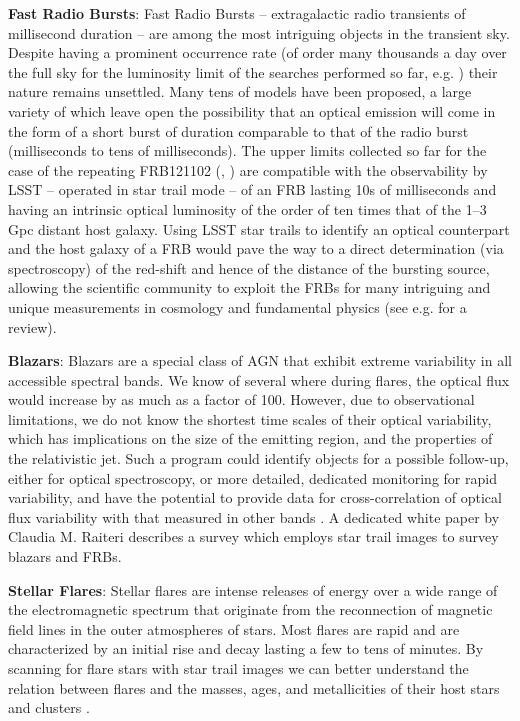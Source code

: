 \documentclass[12pt, letterpaper]{article}
\begin{document}
{\bf Fast Radio Bursts}: Fast Radio Bursts – extragalactic radio transients of millisecond duration – are among the most intriguing objects in the transient sky. Despite having a prominent occurrence rate (of order many thousands a day over the full sky for the luminosity limit of the searches performed so far, e.g. \citealt{keane}) their nature remains unsettled. Many tens of models have been proposed, a large variety of which leave open the possibility that an optical emission will come in the form of a short burst of duration comparable to that of the radio burst (milliseconds to tens of milliseconds). The upper limits collected so far for the case of the repeating FRB121102 (\citealt{2017MNRAS.472.2800H}, \citealt{2018MNRAS.481.2479M}) are compatible with the observability by LSST – operated in star trail mode – of an FRB lasting 10s of milliseconds and having an intrinsic optical luminosity of the order of ten times that of the 1--3 Gpc distant host galaxy. Using LSST star trails to identify an optical counterpart and the host galaxy of a FRB would pave the way to a direct determination (via spectroscopy) of the red-shift and hence of the distance of the bursting source, allowing the scientific community to exploit the FRBs for many intriguing and unique measurements in cosmology and fundamental physics (see e.g. \citealt{2018NatAs...2..836M} for a review).

{\bf Blazars}: Blazars are a special class of AGN that exhibit extreme variability in all accessible spectral bands. We know of several where during flares, the optical flux would increase by as much as a factor of 100. However, due to observational limitations, we do not know the shortest time scales of their optical variability, which has implications on the size of the emitting region, and the properties of the relativistic jet. Such a program could identify objects for a possible follow-up, either for optical spectroscopy, or more detailed, dedicated monitoring for rapid variability, and have the potential to provide data for cross-correlation of optical flux variability with that measured in other bands \citep{2012AA...545A..48R}. A dedicated white paper by Claudia M. Raiteri describes a survey which employs star trail images to survey blazars and FRBs.

{\bf Stellar Flares}: Stellar flares are intense releases of energy over a wide range of the electromagnetic spectrum that originate from the reconnection of magnetic field lines in the outer atmospheres of stars. Most flares are rapid and are characterized by an initial rise and decay lasting a few to tens of minutes. By scanning for flare stars with star trail images we can better understand the relation between flares and the masses, ages, and metallicities of their host stars and clusters \citep{2018arXiv180904510S, 2017ApJ...849...36Y}. 
\end{document}

